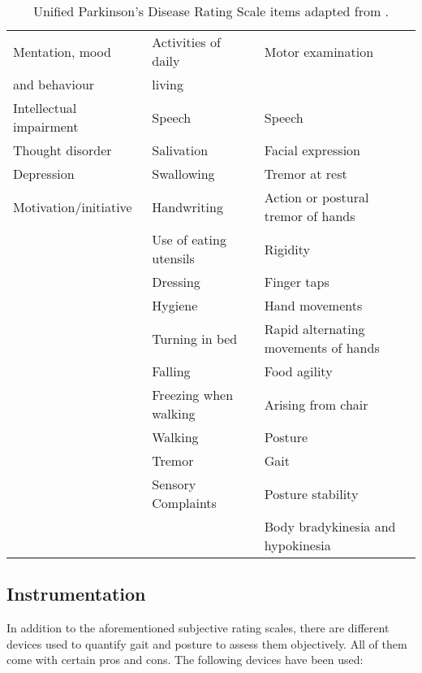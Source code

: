 \begin{table}[h]
\begin{tabular}{lll}
\hline
Mentation, mood & Activities of daily & Motor examination \\
and behaviour & living & \\
\hline
Intellectual impairment & Speech & Speech \\

Thought disorder & Salivation & Facial expression\\

Depression & Swallowing & Tremor at rest \\

Motivation/initiative & Handwriting & Action or postural tremor of hands \\

& Use of eating utensils & Rigidity \\

& Dressing & Finger taps\\

& Hygiene & Hand movements\\

& Turning in bed & Rapid alternating movements of hands\\

& Falling & Food agility\\

& Freezing when walking & Arising from chair \\

& Walking & Posture\\

& Tremor & Gait\\

& Sensory Complaints & Posture stability\\

& & Body bradykinesia and hypokinesia \\
\hline
\end{tabular}
\caption{Unified Parkinson's Disease Rating Scale items adapted from \cite{herndon_handbook_2006}.}
\label{tab:UPDRS}
\end{table}

\subsection{Instrumentation}

In addition to the aforementioned subjective rating scales, there are different devices used to quantify gait and posture to assess them objectively. All of them come with certain pros and cons. The following devices have been used:

